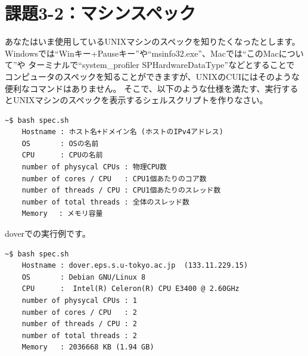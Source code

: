 \documentclass[a4j]{ltjsreport}
\begin{document}
    \section{課題3-2：マシンスペック}
    あなたはいま使用しているUNIXマシンのスペックを知りたくなったとします。
    Windowsでは``Winキー+Pauseキー''や``msinfo32.exe''、Macでは``このMacについて''や
    ターミナルで``system\_profiler SPHardwareDataType''などとすることで
    コンピュータのスペックを知ることができますが、UNIXのCUIにはそのような便利なコマンドはありません。
    そこで、以下のような仕様を満たす、実行するとUNIXマシンのスペックを表示するシェルスクリプトを作りなさい。

    \begin{lstlisting}[numbers=none]
    ~$ bash spec.sh
    Hostname : ホスト名+ドメイン名 (ホストのIPv4アドレス)
    OS       : OSの名前
    CPU      : CPUの名前
    number of physycal CPUs : 物理CPU数　 
    number of cores / CPU   : CPU1個あたりのコア数　 
    number of threads / CPU : CPU1個あたりのスレッド数　 
    number of total threads : 全体のスレッド数
    Memory　 : メモリ容量
    \end{lstlisting}

    doverでの実行例です。
    \begin{lstlisting}[numbers=none]
    ~$ bash spec.sh
    Hostname : dover.eps.s.u-tokyo.ac.jp  (133.11.229.15)
    OS       : Debian GNU/Linux 8
    CPU      :  Intel(R) Celeron(R) CPU E3400 @ 2.60GHz
    number of physycal CPUs : 1
    number of cores / CPU   : 2
    number of threads / CPU : 2
    number of total threads : 2
    Memory   : 2036668 KB (1.94 GB)
    \end{lstlisting}
\end{document}
